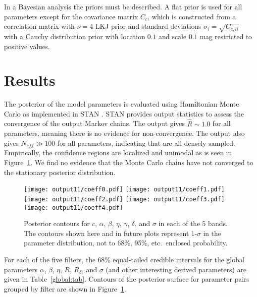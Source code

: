 \documentclass{aastex}   	%
\begin{document}
In a Bayesian analysis the priors must be described.  A flat prior is used for all parameters except
for the covariance matrix $C_c$, which is constructed from a correlation matrix with  $\nu=4$  LKJ prior
\citep{Lewandowski20091989} and standard
deviations $\sigma_i = \sqrt{C_{c,ii}}$ with a  Cauchy distribution prior with location
 $0.1$ and scale $0.1$ mag restricted to positive values.

\section{Results}
\label{results:sec}
The posterior of the model parameters is evaluated using Hamiltonian Monte Carlo as implemented in
STAN \citep{stan}. STAN provides output statistics to assess
the convergence of the output Markov chains.  The output gives $\hat{R} \sim 1.0$ for all parameters, meaning there is no evidence for non-convergence.  The
output also gives  $N_{eff} \gg 100$ for all parameters, indicating that are all densely sampled.
Empirically, the confidence regions are localized and unimodal as is seen in  Figure~\ref{global:fig}.  We find no evidence that
the Monte Carlo chains have not converged to the stationary posterior distribution.

\begin{figure}[htbp] %
   \centering
   \texttt{[image: output11/coeff0.pdf]} 
   \texttt{[image: output11/coeff1.pdf]} 
   \texttt{[image: output11/coeff2.pdf]} 
      \texttt{[image: output11/coeff3.pdf]} 
         \texttt{[image: output11/coeff4.pdf]} 
            \caption{Posterior contours for $c$, $\alpha$, $\beta$, $\eta$, $\gamma$, $\delta$, and $\sigma$ in each of the 5 bands.
            The contours shown here and in future plots represent 1-$\sigma$ in the parameter distribution, not to 68\%, 95\%, etc.\
            enclosed probability.  \label{global:fig}}
\end{figure}


For each of the five filters, the 68\%  equal-tailed credible intervals for the global parameters $\alpha$, $\beta$, $\eta$, $R$, $R_\delta$, and $\sigma$
(and other interesting derived parameters)
are given in Table~\ref{global:tab}.
Contours of the posterior surface for parameter pairs grouped by filter are shown in Figure~\ref{global:fig}.
\end{document}
